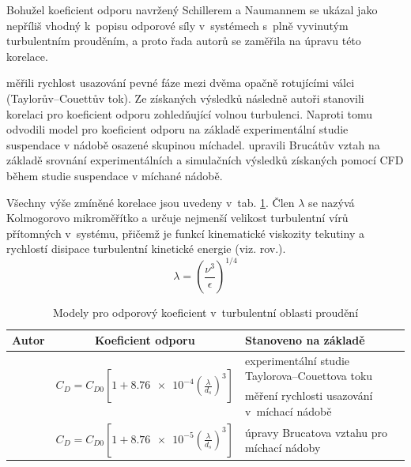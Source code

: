 Bohužel koeficient odporu navržený Schillerem a Naumannem se ukázal jako nepříliš vhodný k~popisu odporové síly v~systémech s~plně vyvinutým turbulentním prouděním, a proto řada autorů se zaměřila na úpravu této korelace.

\citet{bru98} měřili rychlost usazování pevné fáze mezi dvěma opačně rotujícími válci (Taylorův–Couettův tok). Ze získaných výsledků následně autoři stanovili korelaci pro koeficient odporu zohledňující volnou turbulenci. Naproti tomu \citet{pin01} odvodili model pro koeficient odporu na základě experimentální studie suspendace v nádobě osazené skupinou míchadel. \citet{kho06} upravili Brucátův vztah na základě srovnání experimentálních a simulačních výsledků získaných pomocí CFD během studie suspendace v míchané nádobě. 

Všechny výše zmíněné korelace jsou uvedeny v~tab. \ref{tab:cds}. Člen $\lambda$ se nazývá Kolmogorovo mikroměřítko a určuje nejmenší velikost turbulentní vírů přítomných v~systému, přičemž je funkcí kinematické viskozity tekutiny a rychlostí disipace turbulentní kinetické energie (viz. rov.).
\begin{equation}
  \lambda = \left( \frac{\nu^{3}}{\epsilon} \right) ^{1/4}
	\label{eq:kolmo}
\end{equation}

\begin{table}[h!]
\begin{center}
\caption{Modely pro odporový koeficient v~turbulentní oblasti proudění}
\label{tab:cds}
\begin{tabular}{cc>{\centering\arraybackslash}p{5cm}}
\toprule
\textbf{Autor} & \textbf{Koeficient odporu} & \textbf{Stanoveno na základě} \\
\midrule{}

\multirow{2}{*}{\citet{bru98}} & \multirow{2}{*}{$C_{D} = C_{D0} \left[ 1 + \num{8.76e-4} \left( \frac{\lambda}{d_{s}} \right)^{3} \right] $} & experimentální studie Taylorova–Couettova toku \\ \addlinespace

\multirow{2}{*}{\citet{pin01}} & \multirow{2}{*}{$C_{D} = C_{D0} \left[ \num{0.4}\tanh\left(  \frac{16\lambda}{d_{s}} - 1  \right) \right] ^{-2}$} & měření rychlosti usazování v~míchací nádobě \\ \addlinespace

\multirow{2}{*}{\citet{kho06}} & \multirow{2}{*}{$C_{D} = C_{D0} \left[ 1 + \num{8.76e-5} \left( \frac{\lambda}{d_{s}} \right)^{3} \right]$} & úpravy Brucatova vztahu pro míchací nádoby  \\

\bottomrule
\end{tabular}
\end{center}
\end{table}

